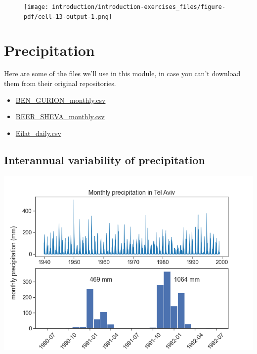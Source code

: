 \documentclass[
  letterpaper,
  DIV=11,
  numbers=noendperiod]{scrreprt}
\providecommand{\tightlist}{%
  \setlength{\itemsep}{0pt}\setlength{\parskip}{0pt}}\usepackage{longtable,booktabs,array}
\begin{document}
\begin{figure}[H]

{\centering \texttt{[image: introduction/introduction-exercises\_files/figure-pdf/cell-13-output-1.png]}

}

\end{figure}

\part{Precipitation}

Here are some of the files we'll use in this module, in case you can't
download them from their original repositories.

\begin{itemize}
\tightlist
\item
  \href{/archive/data/BEN_GURION_monthly.csv}{BEN\_GURION\_monthly.csv}
\item
  \href{/archive/data/BEER_SHEVA_monthly.csv}{BEER\_SHEVA\_monthly.csv}
\item
  \href{/archive/data/Eilat_daily.csv}{Eilat\_daily.csv}
\end{itemize}

\hypertarget{interannual-variability-of-precipitation}{%
\chapter{Interannual variability of
precipitation}\label{interannual-variability-of-precipitation}}

\includegraphics{archive/figures/monthly_tel_aviv_1940-1999.png}
\end{document}
